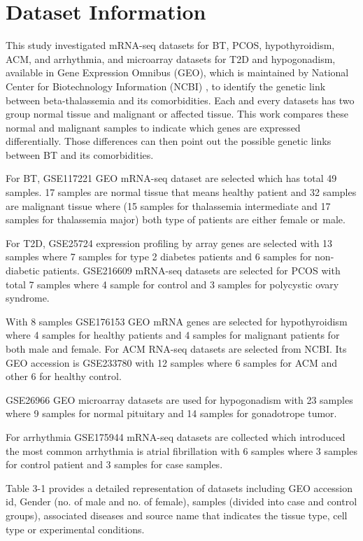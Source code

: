 \section{Dataset Information}
\label{sec:sec3_2}

This study investigated mRNA-seq datasets for BT, PCOS, hypothyroidism, ACM, and arrhythmia, and microarray datasets for T2D and hypogonadism, available in Gene Expression Omnibus (GEO), which is maintained by National Center for Biotechnology Information (NCBI) \cite{b13}, to identify the genetic link between beta-thalassemia and its comorbidities. Each and every datasets has two group normal tissue and malignant or affected tissue. This work compares these normal and malignant samples to indicate which genes are expressed differentially. Those differences can then point out the possible genetic links between BT and its comorbidities.

For BT, GSE117221 GEO mRNA-seq dataset are selected which has total 49 samples. 17 samples are normal tissue that means healthy patient and 32 samples are malignant tissue where (15 samples for thalassemia intermediate and 17 samples for thalassemia major) both type of patients are either female or male. 

For T2D, GSE25724 expression profiling by array genes are selected with 13 samples where 7 samples for type 2 diabetes patients and 6 samples for non-diabetic patients. 
GSE216609 mRNA-seq datasets are selected for PCOS with total 7 samples where 4 sample for control and 3 samples for polycystic ovary syndrome.

With 8 samples GSE176153 GEO mRNA genes are selected for hypothyroidism where 4 samples for healthy patients and 4 samples for malignant patients for both male and female. 
For ACM RNA-seq datasets are selected from NCBI. Its GEO accession is GSE233780 with 12 samples where 6 samples for ACM and other 6 for healthy control. 

GSE26966 GEO microarray datasets are used for hypogonadism with 23 samples where 9 samples for normal pituitary and 14 samples for gonadotrope tumor. 

For arrhythmia GSE175944 mRNA-seq datasets are collected which introduced the most common arrhythmia is atrial fibrillation with 6 samples where 3 samples for control patient and 3 samples for case samples. 

Table 3-1 provides a detailed representation of datasets including GEO accession id, Gender (no. of male and no. of female), samples (divided into case and control groups), associated diseases and source name that indicates the tissue type, cell type or experimental conditions.


